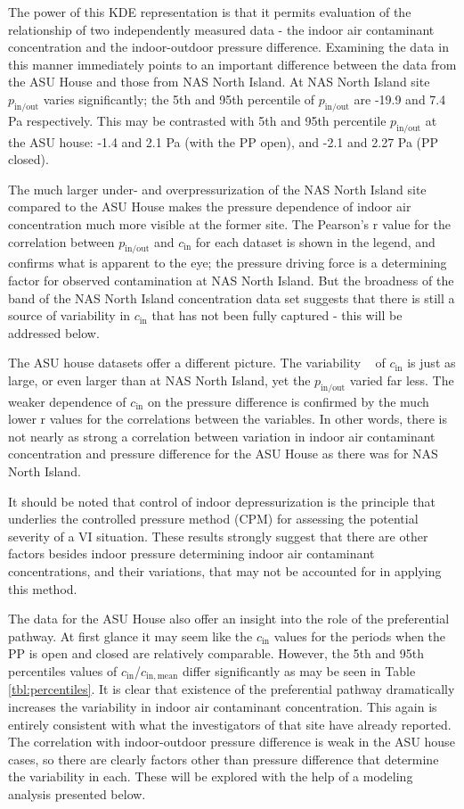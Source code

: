 \documentclass[journal=esthag,manuscript=article]{achemso}
\begin{document}
The power of this KDE representation is that it permits evaluation of the relationship of two independently measured data - the indoor air contaminant concentration and the indoor-outdoor pressure difference.
Examining the data in this manner immediately points to an important difference between the data from the ASU House and those from NAS North Island.
At NAS North Island site $p_\mathrm{in/out}$ varies significantly; the 5th and 95th percentile of $p_\mathrm{in/out}$ are -19.9 and 7.4 Pa respectively.
This may be contrasted with 5th and 95th percentile $p_\mathrm{in/out}$ at the ASU house: -1.4 and 2.1 Pa (with the PP open), and -2.1 and 2.27 Pa (PP closed).

The much larger under- and overpressurization of the NAS North Island site compared to the ASU House makes the pressure dependence of indoor air concentration much more visible at the former site.
The Pearson’s r value for the correlation between $p_\mathrm{in/out}$ and $c_\mathrm{in}$ for each dataset is shown in the legend, and confirms what is apparent to the eye; the pressure driving force is a determining factor for observed contamination at NAS North Island.
But the broadness of the band of the NAS North Island concentration data set suggests that there is still a source of variability in $c_\mathrm{in}$ that has not been fully captured - this will be addressed below.

The ASU house datasets offer a different picture. The variability   of $c_\mathrm{in}$ is just as large, or even larger than at NAS North Island, yet the $p_\mathrm{in/out}$ varied far less. The weaker dependence of $c_\mathrm{in}$ on the pressure difference is confirmed by the much lower r values for the correlations between the variables. In other words, there is not nearly as strong a correlation between variation in indoor air contaminant concentration and pressure difference for the ASU House as there was for NAS North Island.

It should be noted that control of indoor depressurization is the principle that underlies the controlled pressure method (CPM) for assessing the potential severity of a VI situation.
These results strongly suggest that there are other factors besides indoor pressure determining indoor air contaminant concentrations, and their variations, that may not be accounted for in applying this method.

The data for the ASU House also offer an insight into the role of the preferential pathway.
At first glance it may seem like the $c_\mathrm{in}$ values for the periods when the PP is open and closed are relatively comparable.
However, the 5th and 95th percentiles values of $c_\mathrm{in}$/$c_\mathrm{in,mean}$ differ significantly as may be seen in Table \ref{tbl:percentiles}.
It is clear that existence of the preferential pathway dramatically increases the variability in indoor air contaminant concentration.
This again is entirely consistent with what the investigators of that site have already reported\cite{guo_identification_2015}.
The correlation with indoor-outdoor pressure difference is weak in the ASU house cases, so there are clearly factors other than pressure difference that determine the variability in each.
These will be explored with the help of a modeling analysis presented below.
\end{document}
